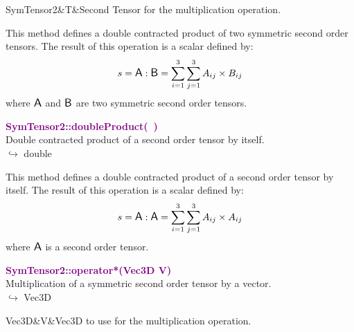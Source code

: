 \begin{tcolorbox}[width=\textwidth,myArgs,tabularx={ll|R},title=Arguments of SymTensor2::doubleProduct]
SymTensor2&T&Second Tensor for the multiplication operation.
\end{tcolorbox}

This method defines a double contracted product of two symmetric second order tensors.
The result of this operation is a scalar defined by:
\begin{equation*}
s = \mbox{\large\ensuremath{\mathsf{A}}} : \mbox{\large\ensuremath{\mathsf{B}}} = \sum_{i=1}^{3} \sum_{j=1}^{3} A_{ij}\times B_{ij}
\end{equation*}
where $\mbox{\large\ensuremath{\mathsf{A}}}$ and $\mbox{\large\ensuremath{\mathsf{B}}}$ are two symmetric second order tensors.

\textcolor{purple}{\textbf{SymTensor2::doubleProduct(~)}}\label{SymTensor2::doubleProduct()}\\
Double contracted product of a second order tensor by itself.\\ \hspace*{10mm}$\hookrightarrow$ double

This method defines a double contracted product of a second order tensor by itself.
The result of this operation is a scalar defined by:
\begin{equation*}
s = \mbox{\large\ensuremath{\mathsf{A}}} : \mbox{\large\ensuremath{\mathsf{A}}} = \sum_{i=1}^{3} \sum_{j=1}^{3} A_{ij}\times A_{ij}
\end{equation*}
where $\mbox{\large\ensuremath{\mathsf{A}}}$ is a second order tensor.

\textcolor{purple}{\textbf{SymTensor2::operator*(Vec3D V)}}\label{SymTensor2::operator*(Vec3D V)}\\
Multiplication of a symmetric second order tensor by a vector.\\ \hspace*{10mm}$\hookrightarrow$ Vec3D

\begin{tcolorbox}[width=\textwidth,myArgs,tabularx={ll|R},title=Arguments of SymTensor2::operator*]
Vec3D&V&Vec3D to use for the multiplication operation.
\end{tcolorbox}

